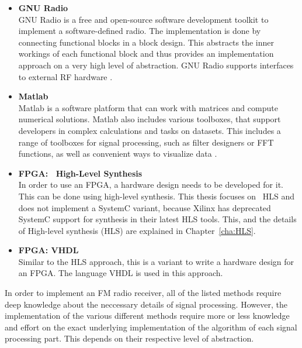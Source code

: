\begin{itemize}
  \item \textbf{GNU Radio}\\
      GNU Radio is a free and open-source software development toolkit to implement a software-defined radio.
      The implementation is done by connecting functional blocks in a block design.
      This abstracts the inner workings of each functional block and thus provides an implementation approach on a very high level of abstraction.
      GNU Radio supports interfaces to external RF hardware \cite{SoftwareGnuRadio}.\\
  \item \textbf{Matlab}\\
      Matlab is a software platform that can work with matrices and compute numerical solutions.
      Matlab also includes various toolboxes, that support developers in complex calculations and tasks on datasets.
      This includes a range of toolboxes for signal processing, such as filter designers or FFT functions, as well as convenient ways to visualize data \cite{SoftwareMatlab}.
  \item \textbf{FPGA: \cplusplus\ High-Level Synthesis}\\
      In order to use an FPGA, a hardware design needs to be developed for it.
      This can be done using high-level synthesis.
      This thesis focuses on \cplusplus\ HLS and does not implement a SystemC variant, because Xilinx has deprecated SystemC support for synthesis in their latest HLS tools.
      This, and the details of High-level synthesis (HLS) are explained in Chapter~\ref{cha:HLS}.

  \item \textbf{FPGA: VHDL}\\
      Similar to the HLS approach, this is a variant to write a hardware design for an FPGA.
      The language VHDL is used in this approach.\\
\end{itemize}

In order to implement an FM radio receiver, all of the listed methods require deep knowledge about the neccessary details of signal processing.
However, the implementation of the various different methods require more or less knowledge and effort on the exact underlying implementation of the algorithm of each signal processing part.
This depends on their respective level of abstraction.


